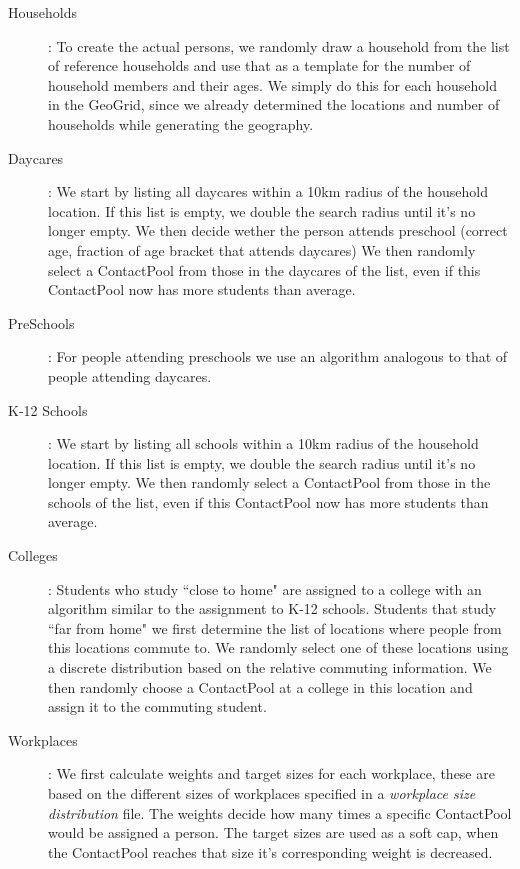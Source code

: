 \begin{description}
    \item[Households]:
        To create the actual persons, we randomly draw a household from the list of reference households 
        and use that as a template for the number of household members and their ages.
        We simply do this for each household in the GeoGrid, since we already determined 
        the locations and number of households while generating the geography.
    \item[Daycares]:
    	We start by listing all daycares within a 10km radius of the household location. 
        If this list is empty, we double the search radius until it's no longer empty.
		We then decide wether the person attends preschool (correct age, fraction of age bracket
		that attends daycares)        
        We then randomly select a ContactPool from those in the daycares of the list,
        even if this ContactPool now has more students than average.
    \item[PreSchools]:
		For people attending preschools we use an algorithm analogous to that of people attending daycares.    	
    \item[K-12 Schools]:
        We start by listing all schools within a 10km radius of the household location. 
        If this list is empty, we double the search radius until it's no longer empty.
        We then randomly select a ContactPool from those in the schools of the list,
        even if this ContactPool now has more students than average.
    \item[Colleges]:
        Students who study ``close to home" are assigned to a college with an algorithm
        similar to the assignment to K-12 schools.
        Students that study ``far from home" we first determine the list of locations 
        where people from this locations commute to. We randomly select one of these locations 
        using a discrete distribution based on the relative commuting information.
        We then randomly choose a ContactPool at a college in this location and assign it to 
        the commuting student.
    \item[Workplaces]:
    	We first calculate weights and target sizes for each workplace, these are based on the different sizes of workplaces
    	specified in a \emph{workplace size distribution} file. The weights decide how many times a specific
    	ContactPool would be assigned a person. The target sizes are used as a soft cap, when the ContactPool reaches that size
    	it's corresponding weight is decreased.

\end{description}
